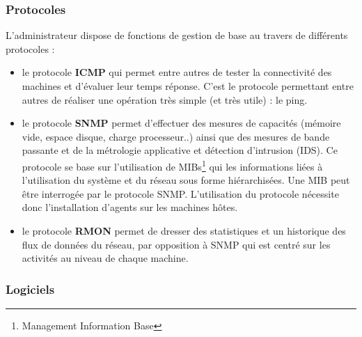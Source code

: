\documentclass[a4paper]{article}
\begin{document}
\subsubsection{Protocoles}

L'administrateur dispose de fonctions de gestion de base au travers de différents protocoles :
\begin{itemize}
\item le protocole \textbf{ICMP} qui permet entre autres de tester la connectivité des machines et d'évaluer leur temps réponse. C'est le protocole permettant entre autres de réaliser une opération très simple (et très utile) : le ping. 
\item le protocole \textbf{SNMP} permet d'effectuer des mesures de capacités (mémoire vide, espace disque, charge processeur..) ainsi que des mesures de bande passante et de la métrologie applicative et détection d'intrusion (IDS). Ce protocole se base sur l'utilisation de MIBs\footnote{Management Information Base} qui les informations liées à l'utilisation du système et du réseau sous forme hiérarchisées. Une MIB peut être interrogée par le protocole SNMP. L'utilisation du protocole nécessite donc l'installation d'agents sur les machines hôtes.
\item le protocole \textbf{RMON} permet de dresser des statistiques et un historique des flux de données du réseau, par opposition à SNMP qui est centré sur les activités au niveau de chaque machine.
\end{itemize}

\subsubsection{Logiciels}
\end{document}
